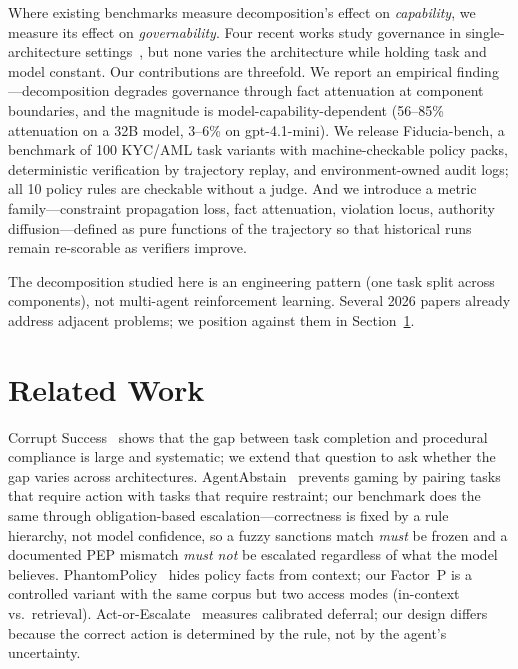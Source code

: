 \documentclass{article}
\begin{document}
Where existing benchmarks measure decomposition's effect on \emph{capability}, we
measure its effect on \emph{governability}. Four recent works study governance in
single-architecture settings~\cite{corrupt,abstain,phantom,escalate}, but none varies
the architecture while holding task and model constant. Our contributions are threefold.
We report an empirical finding---decomposition degrades governance through fact
attenuation at component boundaries, and the magnitude is model-capability-dependent (56--85\% attenuation on a 32B model, 3--6\% on gpt-4.1-mini).
We release Fiducia-bench, a benchmark of 100 KYC/AML task variants with
machine-checkable policy packs, deterministic verification by trajectory replay, and
environment-owned audit logs; all 10 policy rules are checkable without a judge.
And we introduce a metric family---constraint propagation loss, fact attenuation,
violation locus, authority diffusion---defined as pure functions of the trajectory so
that historical runs remain re-scorable as verifiers improve.

The decomposition studied here is an engineering pattern (one task split across
components), not multi-agent reinforcement learning. Several 2026 papers already
address adjacent problems; we position against them in Section~\ref{sec:related}.

\section{Related Work}
\label{sec:related}

Corrupt Success~\cite{corrupt} shows that the gap between task completion and
procedural compliance is large and systematic; we extend that question to ask whether
the gap varies across architectures. AgentAbstain~\cite{abstain} prevents gaming by
pairing tasks that require action with tasks that require restraint; our benchmark does
the same through obligation-based escalation---correctness is fixed by a rule hierarchy,
not model confidence, so a fuzzy sanctions match \emph{must} be frozen and a documented
PEP mismatch \emph{must not} be escalated regardless of what the model believes.
PhantomPolicy~\cite{phantom} hides policy facts from context; our Factor~P is a
controlled variant with the same corpus but two access modes (in-context vs.\ retrieval).
Act-or-Escalate~\cite{escalate} measures calibrated deferral; our design differs because
the correct action is determined by the rule, not by the agent's uncertainty.
\end{document}
